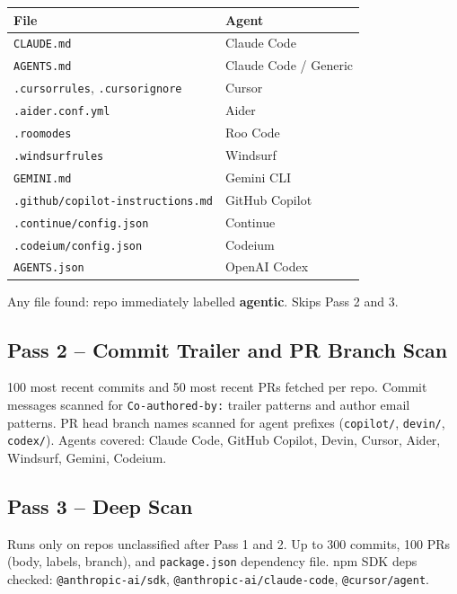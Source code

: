 \documentclass[12pt,a4paper]{article}
\begin{document}
\begin{table}[h]
\centering
\begin{tabular}{@{}ll@{}}
\toprule
File & Agent \\
\midrule
\texttt{CLAUDE.md}                       & Claude Code \\
\texttt{AGENTS.md}                       & Claude Code / Generic \\
\texttt{.cursorrules}, \texttt{.cursorignore} & Cursor \\
\texttt{.aider.conf.yml}                 & Aider \\
\texttt{.roomodes}                       & Roo Code \\
\texttt{.windsurfrules}                  & Windsurf \\
\texttt{GEMINI.md}                       & Gemini CLI \\
\texttt{.github/copilot-instructions.md} & GitHub Copilot \\
\texttt{.continue/config.json}           & Continue \\
\texttt{.codeium/config.json}            & Codeium \\
\texttt{AGENTS.json}                     & OpenAI Codex \\
\bottomrule
\end{tabular}
\end{table}

Any file found: repo immediately labelled \textbf{agentic}. Skips Pass 2 and 3.

\subsection{Pass 2 -- Commit Trailer and PR Branch Scan}

100 most recent commits and 50 most recent PRs fetched per repo. Commit messages
scanned for \texttt{Co-authored-by:} trailer patterns and author email patterns.
PR head branch names scanned for agent prefixes (\texttt{copilot/}, \texttt{devin/},
\texttt{codex/}). Agents covered: Claude Code, GitHub Copilot, Devin, Cursor, Aider,
Windsurf, Gemini, Codeium.

\subsection{Pass 3 -- Deep Scan}

Runs only on repos unclassified after Pass 1 and 2. Up to 300 commits, 100 PRs (body,
labels, branch), and \texttt{package.json} dependency file. npm SDK deps checked:
\texttt{@anthropic-ai/sdk}, \texttt{@anthropic-ai/claude-code}, \texttt{@cursor/agent}.
\end{document}
